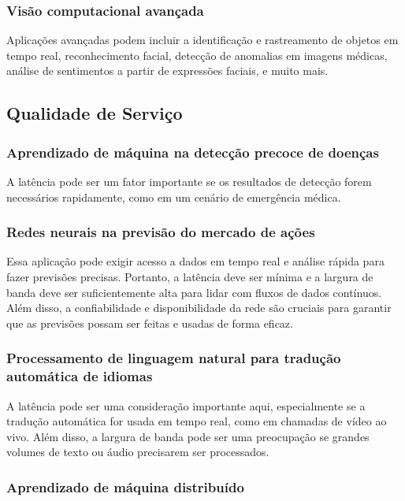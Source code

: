 \subsubsection{Visão computacional avançada}

Aplicações avançadas podem incluir a identificação e rastreamento de objetos em tempo real, reconhecimento facial, detecção de anomalias em imagens médicas, análise de sentimentos a partir de expressões faciais, e muito mais.

\newpage
\subsection{Qualidade de Serviço}

\subsubsection{Aprendizado de máquina na detecção precoce de doenças}

A latência pode ser um fator importante se os resultados de detecção forem necessários rapidamente, como em um cenário de emergência médica.

\subsubsection{Redes neurais na previsão do mercado de ações}

Essa aplicação pode exigir acesso a dados em tempo real e análise rápida para fazer previsões precisas. Portanto, a latência deve ser mínima e a largura de banda deve ser suficientemente alta para lidar com fluxos de dados contínuos. Além disso, a confiabilidade e disponibilidade da rede são cruciais para garantir que as previsões possam ser feitas e usadas de forma eficaz.

\subsubsection{Processamento de linguagem natural para tradução automática de idiomas}

A latência pode ser uma consideração importante aqui, especialmente se a tradução automática for usada em tempo real, como em chamadas de vídeo ao vivo. Além disso, a largura de banda pode ser uma preocupação se grandes volumes de texto ou áudio precisarem ser processados.

\subsubsection{Aprendizado de máquina distribuído}

